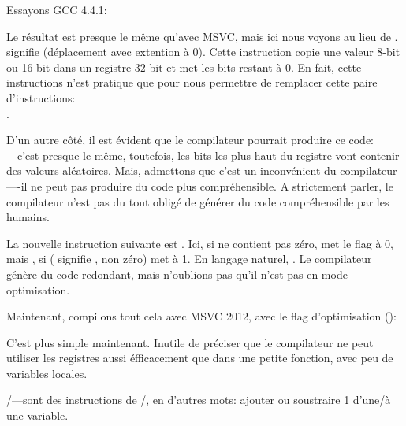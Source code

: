 Essayons GCC 4.4.1:



\label{movzx}

Le résultat est presque le même qu'avec MSVC, mais ici nous voyons \MOVZX au lieu
de \MOVSX.
\MOVZX signifie  (déplacement avec extention à 0).
Cette instruction copie une valeur 8-bit ou 16-bit dans un registre 32-bit et met
les bits restant à 0.
En fait, cette instructions n'est pratique que pour nous permettre de remplacer cette
paire d'instructions:\\
.

D'un autre côté, il est évident que le compilateur pourrait produire ce code: \\
---c'est presque le même, toutefois, les
bits les plus haut du registre \EAX vont contenir des valeurs aléatoires.
Mais, admettons que c'est un inconvénient du compilateur----il ne peut pas produire
du code plus compréhensible. A strictement parler, le compilateur n'est pas du tout
obligé de générer du code compréhensible par les humains.


La nouvelle instruction suivante est \SETNZ.
Ici, si \AL ne contient pas zéro,  met le flag \ZF à 0, mais \SETNZ,
si  ( signifie , non zéro) met \AL à 1. En langage
naturel, . Le compilateur génère
du code redondant, mais n'oublions pas qu'il n'est pas en mode optimisation.

\label{strlen_MSVC_Ox}

Maintenant, compilons tout cela avec MSVC 2012, avec le flag d'optimisation (\Ox):



C'est plus simple maintenant. Inutile de préciser que le compilateur ne peut utiliser
les registres aussi éfficacement que dans une petite fonction, avec peu de variables
locales.

\INC/\DEC---sont des instructions de /,
en d'autres mots: ajouter ou soustraire 1 d'une/à une variable.

